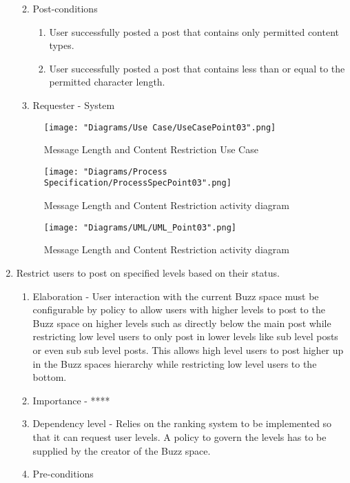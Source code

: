 \documentclass[12pt]{article}
\begin{document}
\begin{enumerate}
\begin{enumerate}
\begin{enumerate}
    \end{enumerate}
        \item Post-conditions
    \begin{enumerate}
    	\item User successfully posted a post that contains only permitted content types.
    	\item User successfully posted a post that contains less than or equal to the permitted character length.
    \end{enumerate}
    \item Requester - System
  \end{enumerate}
\begin{figure}[h]
  	\centering
  	\texttt{[image: "Diagrams/Use Case/UseCasePoint03".png]}
  	\caption{Message Length and Content Restriction Use Case}
  \end{figure}
  \begin{figure}[h]
  		\centering
  		\texttt{[image: "Diagrams/Process Specification/ProcessSpecPoint03".png]}
  		\caption{Message Length and Content Restriction activity diagram}
  	\end{figure}
	\begin{figure}[h]
  		\centering
  		\texttt{[image: "Diagrams/UML/UML\_Point03".png]}
  		\caption{Message Length and Content Restriction activity diagram}
  	\end{figure}
\clearpage %
   \item Restrict users to post on specified levels based on their status. %
  \begin{enumerate}
    \item Elaboration - User interaction with the current Buzz space must be configurable by policy to allow users with higher levels to post to the Buzz space on higher levels such as directly below the main post while restricting low level users to only post in lower levels like sub level posts or even sub sub level posts. This allows high level users to post higher up in the Buzz spaces hierarchy while restricting low level users to the bottom. 
    \item Importance - ****
    \item Dependency level - Relies on the ranking system to be implemented so that it can request user levels. A policy to govern the levels has to be supplied by the creator of the Buzz space.
    \item Pre-conditions

\end{enumerate}
\end{enumerate}
\end{document}
